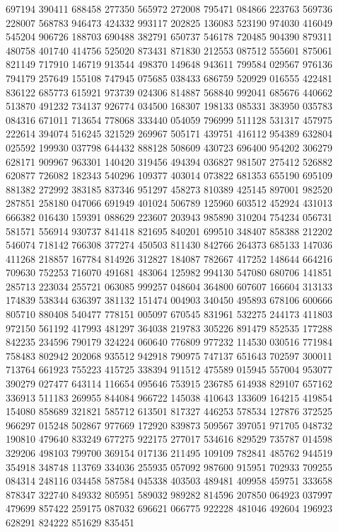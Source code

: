 {697194 390411 688458 277350 565972 272008 795471 084866 223763 569736 228007%
568783 946473 424332 993117 202825 136083 523190 974030 416049 545204 906726%
188703 690488 382791 650737 546178 720485 904390 879311 480758 401740 414756%
525020 873431 871830 212553 087512 555601 875061 821149 717910 146719 913544%
498370 149648 943611 799584 029567 976136 794179 257649 155108 747945 075685%
038433 686759 520929 016555 422481 836122 685773 615921 973739 024306 814887%
568840 992041 685676 440662 513870 491232 734137 926774 034500 168307 198133%
085331 383950 035783 084316 671011 713654 778068 333440 054059 796999 511128%
531317 457975 222614 394074 516245 321529 269967 505171 439751 416112 954389%
632804 025592 199930 037798 644432 888128 508609 430723 696400 954202 306279%
628171 909967 963301 140420 319456 494394 036827 981507 275412 526882 620877%
726082 182343 540296 109377 403014 073822 681353 655190 695109 881382 272992%
383185 837346 951297 458273 810389 425145 897001 982520 287851 258180 047066%
691949 401024 506789 125960 603512 452924 431013 666382 016430 159391 088629%
223607 203943 985890 310204 754234 056731 581571 556914 930737 841418 821695%
840201 699510 348407 858388 212202 546074 718142 766308 377274 450503 811430%
842766 264373 685133 147036 411268 218857 167784 814926 312827 184087 782667%
417252 148644 664216 709630 752253 716070 491681 483064 125982 994130 547080%
680706 141851 285713 223034 255721 063085 999257 048604 364800 607607 166604%
313133 174839 538344 636397 381132 151474 004903 340450 495893 678106 600666%
805710 880408 540477 778151 005097 670545 831961 532275 244173 411803 972150%
561192 417993 481297 364038 219783 305226 891479 852535 177288 842235 234596%
790179 324224 060640 776809 977232 114530 030516 771984 758483 802942 202068%
935512 942918 790975 747137 651643 702597 300011 713764 661923 755223 415725%
338394 911512 475589 015945 557004 953077 390279 027477 643114 116654 095646%
753915 236785 614938 829107 657162 336913 511183 269955 844084 966722 145038%
410643 133609 164215 419854 154080 858689 321821 585712 613501 817327 446253%
578534 127876 372525 966297 015248 502867 977669 172920 839873 509567 397051%
971705 048732 190810 479640 833249 677275 922175 277017 534616 829529 735787%
014598 329206 498103 799700 369154 017136 211495 109109 782841 485762 944519%
354918 348748 113769 334036 255935 057092 987600 915951 702933 709255 084314%
248116 034458 587584 045338 403503 489481 409958 459751 333658 878347 322740%
849332 805951 589032 989282 814596 207850 064923 037997 479699 857422 259175%
087032 696621 066775 922228 481046 492604 196923 628291 824222 851629 835451%
}
